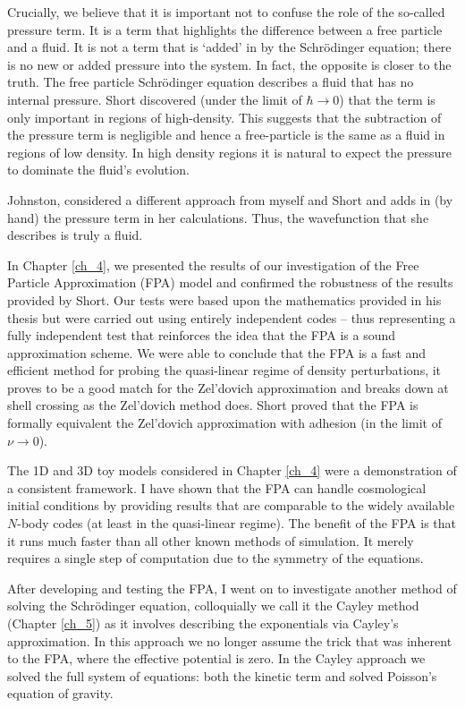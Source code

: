 Crucially, we believe that it is important not to confuse the role of the so-called pressure term. It is a term that highlights the difference between a free particle and a fluid. It is not a term that is `added' in by the Schr\"odinger equation; there is no new or added pressure into the system. In fact, the opposite is closer to the truth. The free particle Schr\"odinger equation describes a fluid that has no internal pressure. Short discovered (under the limit of $\hbar \rightarrow 0$) that the term is only important in regions of high-density. This suggests that the subtraction of the pressure term is negligible and hence a free-particle is the same as a fluid in regions of low density. In high density regions it is natural to expect the pressure to dominate the fluid's evolution.

Johnston, considered a different approach from myself and Short and adds in (by hand) the pressure term in her calculations. Thus, the wavefunction that she describes is truly a fluid.

In Chapter \ref{ch_4}, we presented the results of our investigation of the Free Particle Approximation (FPA) model and confirmed the robustness of the results provided by Short. Our tests were based upon the mathematics provided in his thesis but were carried out using entirely independent codes -- thus representing a fully independent test that reinforces the idea that the FPA is a sound approximation scheme. We were able to conclude that the FPA is a fast and efficient method for probing the quasi-linear regime of density perturbations, it proves to be a good match for the Zel'dovich approximation and breaks down at shell crossing as the Zel'dovich method does. Short proved that the FPA is formally equivalent the Zel'dovich approximation with adhesion (in the limit of $\nu \rightarrow 0$).

The 1D and 3D toy models considered in Chapter \ref{ch_4} were a demonstration of a consistent framework. I have shown that the FPA can handle cosmological initial conditions by providing results that are comparable to the widely available $N$-body codes (at least in the quasi-linear regime). The benefit of the FPA is that it runs much faster than all other known methods of simulation. It merely requires a single step of computation due to the symmetry of the equations.

After developing and testing the FPA, I went on to investigate another method of solving the Schr\"odinger equation, colloquially we call it the Cayley method (Chapter \ref{ch_5}) as it involves describing the exponentials via Cayley's approximation. In this approach we no longer assume the trick that was inherent to the FPA, where the effective potential is zero. In the Cayley approach we solved the full system of equations: both the kinetic term and solved Poisson's equation of gravity.

